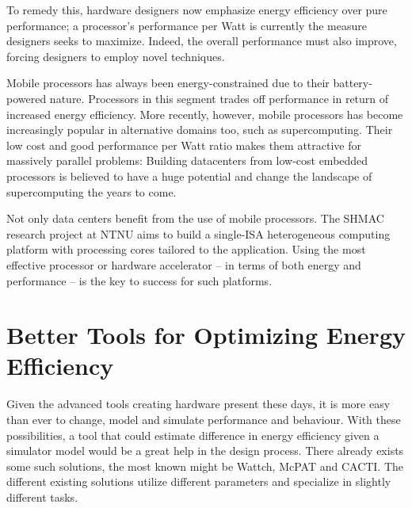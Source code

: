To remedy this, hardware designers now emphasize energy efficiency over pure
performance; a processor's performance per Watt is currently the measure
designers seeks to maximize. Indeed, the overall performance must also improve,
forcing designers to employ novel techniques.


Mobile processors has always been energy-constrained due to their
battery-powered nature. Processors in this segment trades off performance in
return of increased energy efficiency. More recently, however, mobile processors
has become increasingly popular in alternative domains too, such as
supercomputing. Their low cost and good performance per Watt ratio makes them
attractive for massively parallel problems: Building datacenters from low-cost
embedded processors is believed to have a huge potential and change the
landscape of supercomputing the years to come.


Not only data centers benefit from the use of mobile processors. The SHMAC
research project at NTNU aims to build a single-ISA heterogeneous computing
platform with processing cores tailored to the application. Using the most
effective processor or hardware accelerator -- in terms of both energy
and performance -- is the key to success for such platforms.



\section{Better Tools for Optimizing Energy Efficiency}

Given the advanced tools creating hardware present these days, it is more easy
than ever to change, model and simulate performance and behaviour. With these
possibilities, a tool that could estimate difference in energy efficiency given
a simulator model would be a great help in the design process. There already
exists some such solutions, the most known might be
Wattch\cite{brooks2000wattch}, McPAT\cite{hpmcpat,li2013mcpat} and
CACTI\cite{hpcacti}. The different existing solutions utilize different
parameters and specialize in slightly different tasks.


